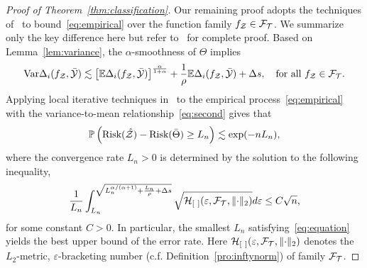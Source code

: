 \documentclass[11pt]{article}
\theoremstyle{plain}
\theoremstyle{definition}
\def\risk{\textup{Risk}}
\begin{document}
\begin{proof}[Proof of Theorem~\ref{thm:classification}]
Our remaining proof adopts the techniques of~\citet[Theorem 3]{wang2008probability} to bound~\eqref{eq:empirical} over the function family $f_{\mathcal{Z}}\in \mathcal{F}_{\mathcal{T}}$. We summarize only the key difference here but refer to~\citep{wang2008probability} for complete proof. 
Based on Lemma~\ref{lem:variance}, the $\alpha$-smoothness of $\Theta$ implies 
\begin{equation}\label{eq:second}
\textup{Var}\Delta_i(f_{\mathcal{Z}},\bar {\mathcal{Y}}) \lesssim \left[\mathbb{E}\Delta_i(f_{\mathcal{Z}},\bar {\mathcal{Y}})\right]^{\alpha \over 1+\alpha}+{1\over \rho}\mathbb{E}\Delta_i(f_{\mathcal{Z}},\bar {\mathcal{Y}})+\Delta s,\quad \text{for all $f_{\mathcal{Z}}\in \mathcal{F}_{\mathcal{T}}$}.
\end{equation}
Applying local iterative techniques in~\citet[Theorem 3]{wang2008probability} to the empirical process~\eqref{eq:empirical} with the variance-to-mean relationship~\eqref{eq:second} gives that
\begin{equation}\label{eq:rate}
\mathbb{P}\left(\risk(\hat \tZ)-\risk(\bar \Theta )\geq L_n\right)\lesssim \exp(-nL_n),
\end{equation}
where the convergence rate $L_n>0$ is determined by the solution to the following inequality,
\begin{equation}\label{eq:equation}
{1\over L_n}\int_{L_n}^{\sqrt{L_n^{\alpha/(\alpha+1)}+{L_n\over \rho}+\Delta s}}\sqrt{\mathcal{H}_{[\ ]}(\varepsilon,\mathcal{F}_{\mathcal{T}}, \lVert\cdot\rVert_2) }d\varepsilon \leq C\sqrt{n},
\end{equation}
for some constant $C>0$. In particular, the smallest $L_n$ satisfying~\eqref{eq:equation} yields the best upper bound of the error rate. Here $\tH_{[\ ]}(\varepsilon, \tF_{\tT},\vnormSize{}{\cdot})$ denotes the $L_2$-metric, $\varepsilon$-bracketing number (c.f. Definition~\ref{pro:inftynorm}) of family $\mathcal{F}_{\mathcal{T}}$. 


\end{proof}
\end{document}
